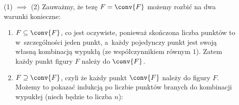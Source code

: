 \begin{itemize}
    \item[(1) \(\implies\) (2)] Zauważmy, że tezę \(F = \conv{F}\) możemy rozbić na dwa warunki konieczne:
        \begin{enumerate}[label={\alph*)}]
            \item \(F \subseteq \conv{F}\), co jest oczywiste, ponieważ skończona liczba punktów to w~szczególności jeden punkt, a~każdy pojedynczy punkt jest swoją własną kombinacją wypukłą (ze współczynnikiem równym \(1\)). Zatem każdy punkt figury \(F\) należy do \(\conv{F}\).
            \item \(F \supseteq \conv{F}\), czyli że każdy punkt \(\conv{F}\) należy do figury \(F\). Możemy to pokazać indukcją po liczbie punktów branych do kombinacji wypukłej (niech będzie to liczba \(n\)):
        \end{enumerate}
\end{itemize}
